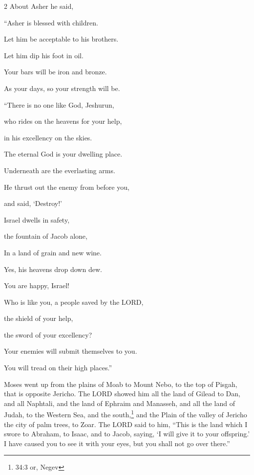 \begin{multicols}{2}
\myverse{}About Asher he said,

“Asher is blessed with children.

Let him be acceptable to his brothers.

Let him dip his foot in oil.

\myverse{}Your bars will be iron and bronze.

As your days, so your strength will be.


\vspace{\baselineskip} \myverse{}“There is no one like God, Jeshurun,

who rides on the heavens for your help,

in his excellency on the skies.

\myverse{}The eternal God is your dwelling place.

Underneath are the everlasting arms.

He thrust out the enemy from before you,

and said, ‘Destroy!’

\myverse{}Israel dwells in safety,

the fountain of Jacob alone,

In a land of grain and new wine.

Yes, his heavens drop down dew.

\myverse{}You are happy, Israel!

Who is like you, a people saved by the LORD,

the shield of your help,

the sword of your excellency?

Your enemies will submit themselves to you.

You will tread on their high places.”
\end{multicols}


\mychapter{} \myverse*{}Moses went up from the plains of Moab to Mount Nebo, to the top
of Pisgah, that is opposite Jericho. The LORD showed him all the land of Gilead to Dan,
\myverse{}and all Naphtali, and the land of Ephraim and Manasseh, and all the land of
Judah, to the Western Sea,
\myverse{}and the south,\footnote{34:3 or, Negev} and the Plain of the valley of Jericho the city of palm trees, to Zoar.
\myverse{}The LORD said to him, “This is the land which I swore to Abraham, to Isaac,
and to Jacob, saying, ‘I will give it to your offspring.’ I have caused you to see it with your eyes,
but you shall not go over there.”

